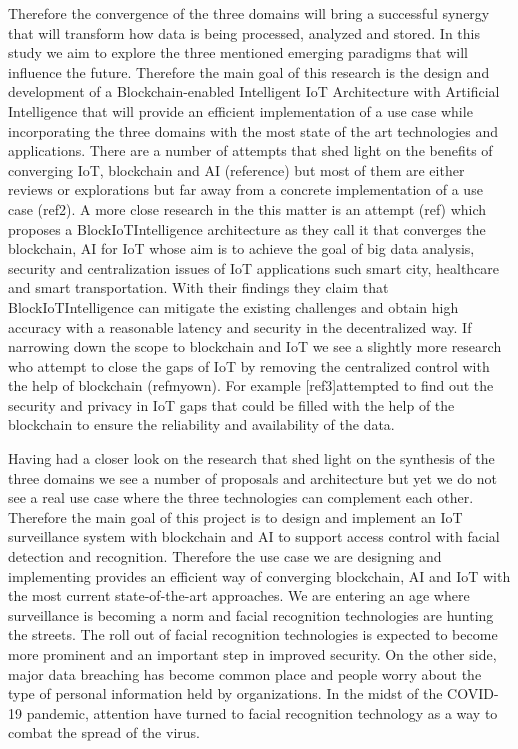 Therefore the convergence of the three domains will bring a successful synergy that will transform how data is being processed, analyzed and stored. In this study we aim to explore the three mentioned emerging paradigms that will influence the future. Therefore the main goal of this research is the design and development of a Blockchain-enabled Intelligent IoT Architecture with Artificial Intelligence that will provide an efficient implementation of a use case while incorporating the three domains with the most state of the art technologies and applications. 
There are a number of attempts that shed light on the benefits of converging IoT, blockchain and AI (reference) but most of them are either reviews or explorations but far away from a concrete implementation of a use case (ref2). A more close research in the this matter is an attempt (ref) which proposes a BlockIoTIntelligence architecture as they call it that converges the blockchain, AI for IoT whose aim is to achieve the goal of big data analysis, security and centralization issues of IoT applications such smart city, healthcare and smart transportation. With their findings they claim that BlockIoTIntelligence can mitigate the existing challenges and obtain high accuracy with a reasonable latency and security in the decentralized way. 
If narrowing down the scope to blockchain and IoT we see a slightly more research who attempt to close the gaps of IoT by removing the centralized control with the help of blockchain (refmyown).
For example [ref3]attempted to find out the security and privacy in IoT  gaps that could be filled with the help of the blockchain to ensure the reliability and availability of the data. 

Having had a closer look on the research that shed light on the synthesis of the three domains we see a number of proposals and architecture but yet we do not see a real use case where the three technologies can complement each other. 
Therefore the main goal of this project is to design and implement an IoT surveillance system with blockchain and AI to support access control with facial detection and recognition. Therefore the use case we are designing and implementing provides an efficient way of converging blockchain, AI and IoT with the most current state-of-the-art approaches. 
We are entering an age where surveillance is becoming a norm and facial recognition technologies are hunting the streets. The roll out of facial recognition technologies is expected to become more prominent and an important step in improved security. On the other side, major data breaching has become common place and people worry about the type of personal information held by organizations. In the midst of the COVID-19 pandemic, attention have turned to facial recognition technology as a way to combat the spread of the virus.

